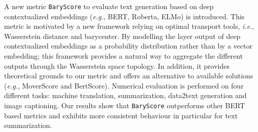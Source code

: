 A new metric \texttt{BaryScore} to evaluate text generation based on deep contextualized embeddings (\textit{e.g.}, BERT, Roberta, ELMo) is introduced. This metric is motivated by a new framework relying on optimal transport tools, \textit{i.e.}, Wasserstein distance and barycenter. By modelling the layer output of deep contextualized embeddings as a probability distribution rather than by a vector embedding; this framework provides a natural way to aggregate the different outputs through the Wasserstein space topology. In addition, it provides theoretical grounds to our metric and offers an alternative to available solutions (\textit{e.g.},  MoverScore and BertScore). Numerical evaluation is performed on four different tasks:  machine translation, summarization, data2text generation and image captioning. Our results show that \texttt{BaryScore} outperforms other BERT based metrics and exhibits more consistent behaviour in particular for text summarization.
